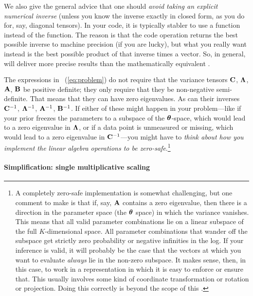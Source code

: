 We also give the general advice that one should \emph{avoid taking an explicit
numerical inverse} (unless you know the inverse exactly in closed form, as you
do for, say, diagonal tensors).
In your code, it is typically stabler to use a  function instead
of the  function.
The reason is that the code operation  returns the best
possible inverse to machine precision (if you are lucky), but what you
really want instead is the best possible product of that inverse times
a vector.
So, in general,  will deliver more precise results than
the mathematically equivalent .

The expressions in \equationname~(\ref{eq:problem}) do not require that the variance tensors
$\mathbf{C}$, $\mathbf{\Lambda}$, $\mathbf{A}$, $\mathbf{B}$ be positive definite; they only require
that they be non-negative semi-definite.
That means that they can have zero eigenvalues.
As can their inverses $\mathbf{C}^{-1}$, $\mathbf{\Lambda}^{-1}$, $\mathbf{A}^{-1}$, $\mathbf{B}^{-1}$.
If either of these might happen in your problem---like if your prior
freezes the parameters to a subspace of the $\boldsymbol{\theta}$-space, which
would lead to a zero eigenvalue in $\mathbf{\Lambda}$, or if a data point is
unmeasured or missing, which would lead to a zero eigenvalue in
$\mathbf{C}^{-1}$---you might have to \emph{think about how you implement the
  linear algebra operations to be zero-safe}.\footnote{A completely
  zero-safe implementation
  is somewhat challenging, but one comment to make is that if, say, $\mathbf{A}$
  contains a zero eigenvalue, then there is a direction in the parameter
  space (the $\boldsymbol{\theta}$ space) in which the variance vanishes. This means that
  all valid parameter combinations lie on a linear subspace of the full $K$-dimensional
  space. All parameter combinations that wander off the subspace get strictly
  zero probability or negative infinities in the log.
  If your inference is valid, it will probably be the case that the
  vectors at which you want to evaluate \emph{always} lie in the non-zero
  subspace. It makes sense, then, in this case, to work in a representation in which it is easy
  to enforce or ensure that. This usually involves some kind of coordinate transformation
  or rotation or projection. Doing this correctly is beyond the scope of this \documentname.}

\paragraph{Simplification: single multiplicative scaling}


